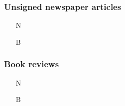 \documentclass[11pt,letterpaper,oneside]{article}
\begin{document}
\subsubsection{Unsigned newspaper articles}

\begin{itemize}
\item[N] 

\item[B] 
\end{itemize}



\setcounter{subsubsection}{214}
\subsubsection{Book reviews}
\label{14.215}

\begin{itemize}
\item[N] 

\item[B] 
\end{itemize}




\end{document}
